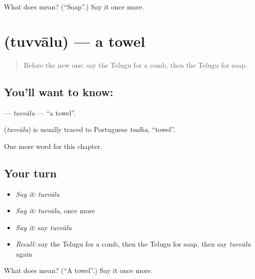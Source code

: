 \begin{tcolorbox}[breakable,colback=teal!4,colframe=teal!35!black,title={Before you move on}]
What does  mean? (\textquotedblleft{}Soap\textquotedblright{}.) Say it once more.
\end{tcolorbox}
\section[\texorpdfstring{\te{తువ్వాలు} (tuvvālu)}{తువ్వాలు (tuvvālu)}]{ (tuvvālu) — a towel}

\label{lesson:TE-C111-tuvvalu}



\begin{quote}
Before the new one: say the Telugu for a comb, then the Telugu for soap.
\end{quote}

\subsection*{You'll want to know: }
\textbf{} — \emph{tuvvālu} — \textquotedblleft{}a towel\textquotedblright{}.

\begin{cousinweb}
\textbf{} (\emph{tuvvālu}) is usually traced to Portuguese \emph{toalha}, \textquotedblleft{}towel\textquotedblright{}.
\end{cousinweb}

\begin{grammarlens}[title={What you've built}]
One more word for this chapter.
\end{grammarlens}

\subsection*{Your turn}
\begin{itemize}
\raggedright
  \item \emph{Say it:} \emph{tuvvālu}
  \item \emph{Say it:} \emph{tuvvālu}, once more
  \item \emph{Say it:} say \emph{tuvvālu}
  \item \emph{Recall:} say the Telugu for a comb, then the Telugu for soap, then say \emph{tuvvālu} again
\end{itemize}

\begin{tcolorbox}[breakable,colback=teal!4,colframe=teal!35!black,title={Before you move on}]
What does  mean? (\textquotedblleft{}A towel\textquotedblright{}.) Say it once more.
\end{tcolorbox}
